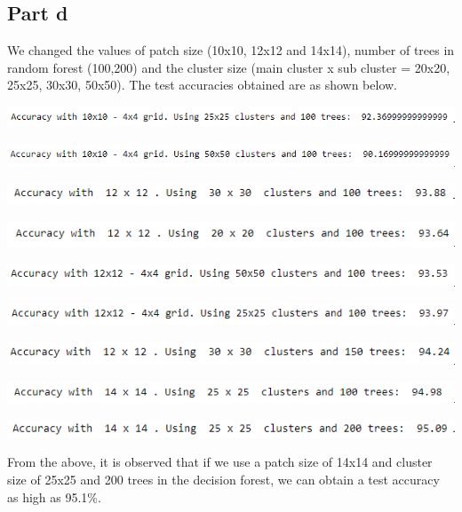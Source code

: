 \documentclass{article}      %
\begin{document}
\subsection{Part d}

We changed the values of patch size (10x10, 12x12 and 14x14), number of trees in random forest (100,200) and the cluster size (main cluster x sub cluster = 20x20, 25x25, 30x30, 50x50). The test accuracies obtained are as shown below.

\includegraphics[width=\textwidth]{IMG_5535}

\includegraphics[width=\textwidth]{IMG_5536}

\includegraphics[width=\textwidth]{IMG_5533}

\includegraphics[width=\textwidth]{IMG_5534}

\includegraphics[width=\textwidth]{IMG_5537}

\includegraphics[width=\textwidth]{IMG_5538}

\includegraphics[width=\textwidth]{IMG_5539}

\includegraphics[width=\textwidth]{IMG_5540}

\includegraphics[width=\textwidth]{IMG_5541}

From the above, it is observed that if we use a patch size of 14x14 and cluster size of 25x25 and 200 trees in the decision forest, we can obtain a test accuracy as high as 95.1\%.
 
\end{document}
